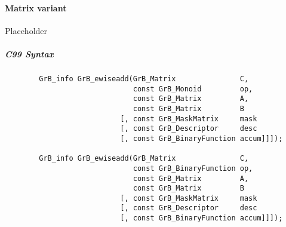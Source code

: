 
\paragraph{Matrix variant}

Placeholder



\subparagraph{C99 Syntax}

\begin{verbatim}
        GrB_info GrB_ewiseadd(GrB_Matrix               C,
                              const GrB_Monoid         op, 
                              const GrB_Matrix         A,
                              const GrB_Matrix         B
                           [, const GrB_MaskMatrix     mask
                           [, const GrB_Descriptor     desc
                           [, const GrB_BinaryFunction accum]]]);
                            
        GrB_info GrB_ewiseadd(GrB_Matrix               C,
                              const GrB_BinaryFunction op, 
                              const GrB_Matrix         A,
                              const GrB_Matrix         B
                           [, const GrB_MaskMatrix     mask
                           [, const GrB_Descriptor     desc
                           [, const GrB_BinaryFunction accum]]]);
\end{verbatim}

